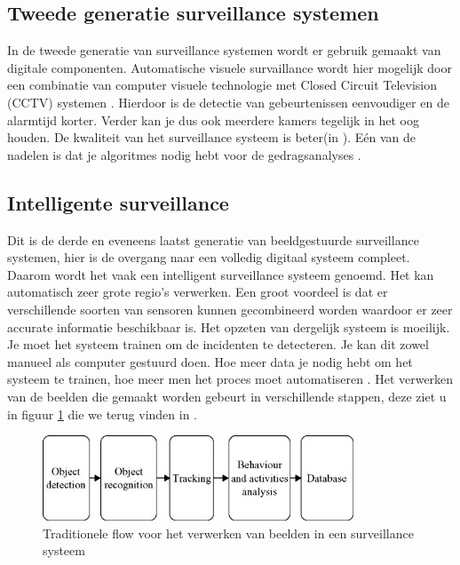 \subsection{Tweede generatie surveillance systemen}
\label{refTGS}
In de tweede generatie van surveillance systemen wordt er gebruik gemaakt van digitale componenten. Automatische visuele survaillance wordt hier mogelijk door een combinatie van computer visuele technologie met Closed Circuit Television (CCTV) systemen \cite{bibIPC2}. Hierdoor is de detectie van gebeurtenissen eenvoudiger en de alarmtijd korter. Verder kan je dus ook meerdere kamers tegelijk in het oog houden. De kwaliteit van het surveillance systeem is beter(in \cite{bibVTC2}). E\'en van de nadelen is dat je algoritmes nodig hebt voor de gedragsanalyses \cite{bibIPC2}.

\subsection{Intelligente surveillance}
\label{refINS}
Dit is de derde en eveneens laatst generatie van beeldgestuurde surveillance systemen, hier is de overgang naar een volledig digitaal systeem compleet\cite{bibVTC2}. Daarom wordt het vaak een intelligent surveillance systeem genoemd. Het kan automatisch zeer grote regio's verwerken. Een groot voordeel is dat er verschillende soorten van sensoren kunnen gecombineerd worden waardoor er zeer accurate informatie beschikbaar is. Het opzeten van dergelijk systeem is moeilijk. Je moet het systeem trainen om de incidenten te detecteren. Je kan dit zowel manueel als computer gestuurd doen. Hoe meer data je nodig hebt om het systeem te trainen, hoe meer men het proces moet automatiseren \cite{bibVTS}. Het verwerken van de beelden die gemaakt worden gebeurt in verschillende stappen, deze ziet u in figuur \ref{imgVTS} die we terug vinden in \cite{bibIPC2}.
\begin{figure}[h]
	\includegraphics[scale=0.85]{FlowSurveillance}
	\caption{Traditionele flow voor het verwerken van beelden in een surveillance systeem}
	\label{imgVTS}
\end{figure}

